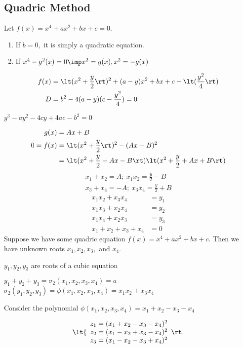 \documentclass[a4paper]{article}
\begin{document}
\subsection{Quadric Method}
Let \( f(x) = x^4+ax^2+bx+c = 0 \). \begin{enumerate}
  \item If \( b=0, \) it is simply a quadratic equation.
  \item If \( x^4-g^2(x) = 0 \imp x^2 = g(x), x^2 = -g(x) \)
\end{enumerate}
\begin{align*}
  f(x) &= \lt(x^2+\frac{y}{2}\rt)^2 + (a-y)x^2+bx+c - \lt(\frac{y^2}{4}\rt) \\
  D &= b^2 - 4(a-y)(c-\frac{y^2}{4}) = 0
\end{align*}
\begin{definition}
  \( y^3-ay^2-4cy+4ac-b^2 = 0 \)
\end{definition}
\begin{align*}
  g(x) &= Ax+B \\
  0 = f(x) &= \lt(x^2+\frac{y}{2}\rt)^2 - (Ax+B)^2 \\
           &= \lt(x^2+\frac{y}{2}-Ax-B\rt)\lt(x^2+\frac{y}{2}+Ax+B\rt) \\
\end{align*}
\begin{align*}
  x_1+x_2 = A;\ x_1x_2 = \frac{y}{2}-B  \\
  x_3+x_4 = -A;\ x_3x_4 = \frac{y}{2}+B
\end{align*}
\begin{align*}
  x_1x_2+x_3x_4 &= y_1 \\
  x_1x_3+x_2x_4 &= y_2 \\
  x_1x_4+x_2x_3 &= y_3 \\
  x_1+x_2+x_3+x_4 &= 0
\end{align*}
Suppose we have some quadric equation \( f(x) = x^4+ax^2+bx+c \). Then we have unknown roots \( x_1, x_2, x_3, \) and \( x_4 \).
\begin{claim}
  \( y_1, y_2, y_3 \) are roots of a cubic equation
\end{claim}
\( y_1+y_2+y_3 = \sigma_2(x_1,x_2,x_3,x_4) = a\) \\
\( \sigma_2(y_1,y_2,y_3) = \phi(x_1,x_2,x_3,x_4) = x_1x_2 + x_3x_4 \)

\begin{example}
  Consider the polynomial \( \phi(x_1,x_2,x_3,x_4) = x_1+x_2-x_3-x_4 \)

  \begin{align*}
    \lt\{
      \begin{array}{l}
      z_1=(x_1+x_2-x_3-x_4)^2\\
      z_2=(x_1-x_2+x_3-x_4)^2\\
      z_3=(x_1-x_2-x_3+x_4)^2
      \end{array}
      \rt.
  \end{align*}
\end{example}
\end{document}
